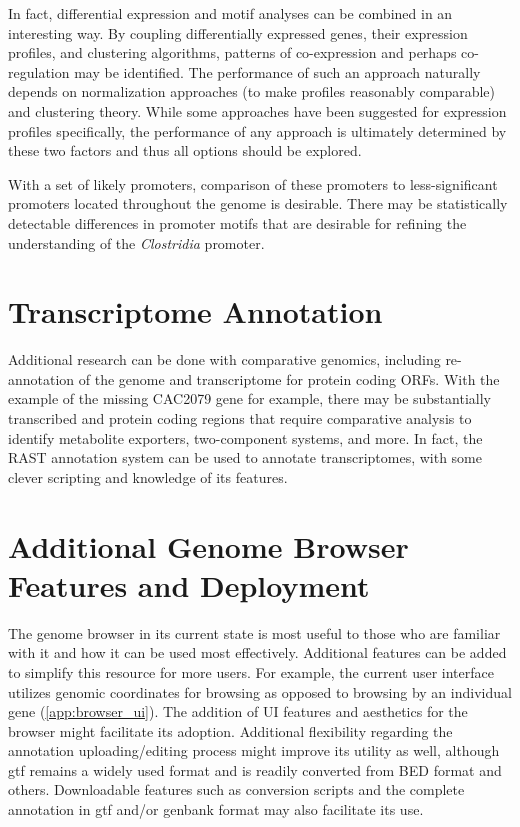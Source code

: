 In fact, differential expression and motif analyses can be combined in an interesting way. By coupling differentially expressed genes, their expression profiles, and clustering algorithms, patterns of co-expression and perhaps co-regulation may be identified. The performance of such an approach naturally depends on normalization approaches (to make profiles reasonably comparable) and clustering theory. While some approaches have been suggested for expression profiles specifically, the performance of any approach is ultimately determined by these two factors and thus all options should be explored.

With a set of likely promoters, comparison of these promoters to less-significant promoters located throughout the genome is desirable. There may be statistically detectable differences in promoter motifs that are desirable for refining the understanding of the \textit{Clostridia} promoter.

\section{Transcriptome Annotation}
Additional research can be done with comparative genomics, including re-annotation of the genome and transcriptome for protein coding ORFs. With the example of the missing CAC2079 gene for example, there may be substantially transcribed and protein coding regions that require comparative analysis to identify metabolite exporters, two-component systems, and more. In fact, the RAST annotation system\cite{160} can be used to annotate transcriptomes, with some clever scripting and knowledge of its features.

\section{Additional Genome Browser Features and Deployment}
The genome browser in its current state is most useful to those who are familiar with it and how it can be used most effectively. Additional features can be added to simplify this resource for more users. For example, the current user interface utilizes genomic coordinates for browsing as opposed to browsing by an individual gene (\ref{app:browser_ui}). The addition of UI features and aesthetics for the browser might facilitate its adoption. Additional flexibility regarding the annotation uploading/editing process might improve its utility as well, although gtf remains a widely used format and is readily converted from BED format and others. Downloadable features such as conversion scripts and the complete annotation in gtf and/or genbank format may also facilitate its use.


